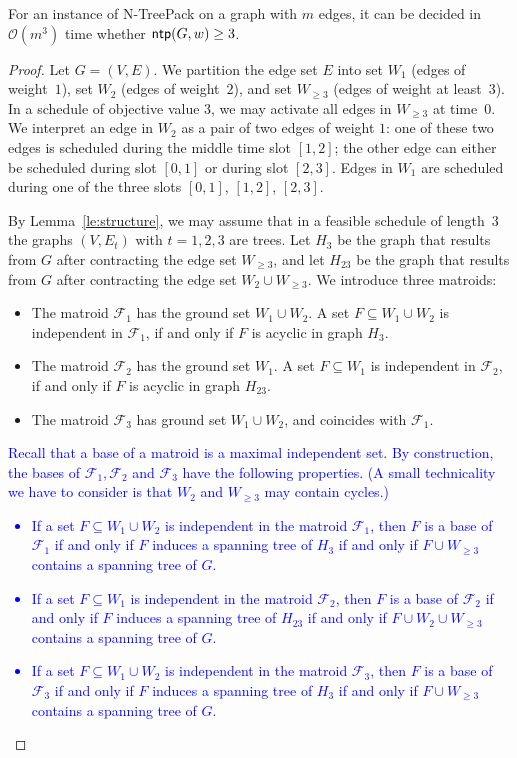 \documentclass[runningheads]{llncs}
\newcommand{\bigO}{\mathcal{O}}
\newcommand{\xxxNTP}{{\sc N-TreePack}}
\DeclareMathOperator{\ntp}{\text{\sf ntp}}
\newcommand{\lasse}[1]{\textcolor{blue}{#1}}
\begin{document}
\begin{theorem}
\label{th:value=3}
For an instance of {\xxxNTP} on a graph with $m$ edges, it can be decided in $\bigO(m^3)$ time 
whether $\ntp(G,w)\ge3$.
\end{theorem}
\begin{proof}
Let $G=(V,E)$. 
We partition the edge set $E$ into set $W_1$ (edges of weight~$1$), set $W_2$ (edges of weight~$2$),
and set $W_{\ge3}$ (edges of weight at least~$3$).
In a schedule of objective value $3$, we may activate all edges in $W_{\ge3}$ at time~$0$.
We interpret an edge in $W_2$ as a pair of two edges of weight $1$: one of these two edges is scheduled 
during the middle time slot $[1, 2]$; the other edge can either be scheduled during slot $[0,1]$ 
or during slot $[2,3]$. 
Edges in $W_1$ are scheduled during one of the three slots $[0,1]$, $[1,2]$, $[2,3]$.

By Lemma~\ref{le:structure}, we may assume that in a feasible schedule of length~$3$ the 
graphs $(V,E_t)$ with $t=1,2,3$ are trees.
Let $H_3$    be the graph that results from $G$ after contracting the edge set $W_{\ge3}$, and
let $H_{23}$ be the graph that results from $G$ after contracting the edge set $W_2\cup W_{\ge3}$.
We introduce three matroids:
\begin{itemize}
\item The matroid $\mathcal{F}_1$ has the ground set $W_1\cup W_2$. 
A set $F\subseteq W_1\cup W_2$ is independent in $\mathcal{F}_1$, if and only if $F$ is acyclic in graph $H_3$.
\item The matroid $\mathcal{F}_2$ has the ground set $W_1$.
A set $F\subseteq W_1$ is independent in $\mathcal{F}_2$, if and only if $F$ is acyclic in graph $H_{23}$.
\item The matroid $\mathcal{F}_3$ has ground set $W_1\cup W_2$, and coincides with $\mathcal{F}_1$.
\end{itemize}
\lasse{Recall that a base of a matroid is a maximal independent set. By construction, the bases of $\mathcal{F}_1, \mathcal{F}_2$ and $\mathcal{F}_3$ have the following properties. (A small technicality we have to consider is that $W_2$ and $W_{\geq3}$ may contain cycles.)}
\lasse{
\begin{itemize}
\item If a set $F \subseteq W_1 \cup W_2$ is independent in the matroid $\mathcal{F}_1$, then $F$ is a base of $\mathcal{F}_1$ if and only if $F$ induces a spanning tree of $H_3$ if and only if $F \cup W_{\geq 3}$ contains a spanning tree of $G$.
\item If a set $F \subseteq W_1$ is independent in the matroid $\mathcal{F}_2$, then $F$ is a base of $\mathcal{F}_2$ if and only if $F$ induces a spanning tree of $H_{23}$ if and only if $F \cup W_2 \cup W_{\geq 3}$ contains a spanning tree of $G$.
\item If a set $F \subseteq W_1 \cup W_2$ is independent in the matroid $\mathcal{F}_3$, then $F$ is a base of $\mathcal{F}_3$ if and only if $F$ induces a spanning tree of $H_3$ if and only if $F \cup W_{\geq 3}$ contains a spanning tree of $G$.
\end{itemize}
}


\end{proof}
\end{document}
